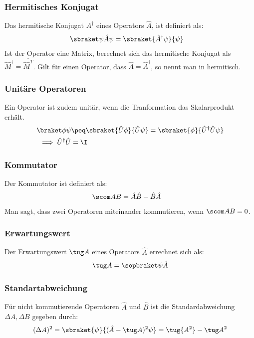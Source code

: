 \documentclass[twocolumn, unnumberedsubsub]{summery_3.1}
\begin{document}
\subsubsection{Hermitisches Konjugat}
Das hermitische Konjugat \(A^\dagger\) eines Operators \(\hat A\), ist definiert als:
\begin{align*}
    \sbraket\psi{\hat A\psi} &= \sbraket{\hat A^\dagger\psi}{\psi}
\end{align*}
Ist der Operator eine Matrix, berechnet sich das hermitische Konjugat als \(\hat M^\dagger = \overline{\hat M ^T}\).
Gilt für einen Operator, dass \(\hat A = \hat A^\dagger\), so nennt man in hermitisch.  

\subsubsection{Unitäre Operatoren}
Ein Operator ist zudem unitär, wenn die Tranformation das Skalarprodukt erhält.
\begin{align*}
    \braket\phi\psi &\peq \sbraket{\hat U \phi}{ \hat U \psi}
    = \sbraket{\phi}{\hat U^\dagger \hat U \psi}\\
    \implies \hat U^\dagger \hat U &= \I
\end{align*}

\subsubsection{Kommutator}
Der Kommutator ist definiert als:
\begin{align*}
    \scom AB &= \hat A \hat B - \hat B \hat A
\end{align*}
Man sagt, dass zwei Operatoren miteinander kommutieren, wenn \(\scom AB = 0\).  


\subsubsection{Erwartungswert}
Der Erwartungswert \(\tug A\) eines Operators \(\hat A\) errechnet sich als:
\begin{align*}
    \tug A = \sopbraket\psi {\hat A}
\end{align*}

\subsubsection{Standartabweichung}
Für nicht kommutierende Operatoren \(\hat A\) und \(\hat B\) ist die Standardabweichung \(\Delta A,\Delta B\)
gegeben durch:
\begin{align*}
    (\Delta A)^2 &= \sbraket{\psi}{(\hat A - \tug A)^2\psi}
    = \tug {A^2}- \tug A^2\\
\end{align*}
\end{document}

